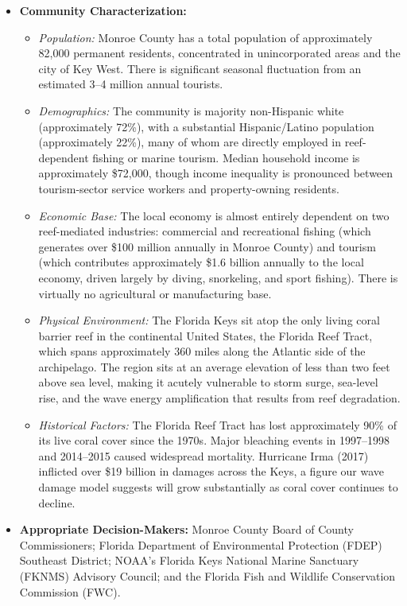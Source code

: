 \documentclass[10pt,letterpaper]{article}
\begin{document}
\begin{itemize}
    \item \textbf{Community Characterization:}
    \begin{itemize}
        \item \textit{Population:} Monroe County has a total population of approximately 82,000 permanent residents, concentrated in unincorporated areas and the city of Key West. There is significant seasonal fluctuation from an estimated 3--4 million annual tourists.
        \item \textit{Demographics:} The community is majority non-Hispanic white (approximately 72\%), with a substantial Hispanic/Latino population (approximately 22\%), many of whom are directly employed in reef-dependent fishing or marine tourism. Median household income is approximately \$72,000, though income inequality is pronounced between tourism-sector service workers and property-owning residents.
        \item \textit{Economic Base:} The local economy is almost entirely dependent on two reef-mediated industries: commercial and recreational fishing (which generates over \$100 million annually in Monroe County) and tourism (which contributes approximately \$1.6 billion annually to the local economy, driven largely by diving, snorkeling, and sport fishing). There is virtually no agricultural or manufacturing base.
        \item \textit{Physical Environment:} The Florida Keys sit atop the only living coral barrier reef in the continental United States, the Florida Reef Tract, which spans approximately 360 miles along the Atlantic side of the archipelago. The region sits at an average elevation of less than two feet above sea level, making it acutely vulnerable to storm surge, sea-level rise, and the wave energy amplification that results from reef degradation.
        \item \textit{Historical Factors:} The Florida Reef Tract has lost approximately 90\% of its live coral cover since the 1970s. Major bleaching events in 1997--1998 and 2014--2015 caused widespread mortality. Hurricane Irma (2017) inflicted over \$19 billion in damages across the Keys, a figure our wave damage model suggests will grow substantially as coral cover continues to decline.
    \end{itemize}

    \item \textbf{Appropriate Decision-Makers:} Monroe County Board of County Commissioners; Florida Department of Environmental Protection (FDEP) Southeast District; NOAA's Florida Keys National Marine Sanctuary (FKNMS) Advisory Council; and the Florida Fish and Wildlife Conservation Commission (FWC).

\end{itemize}
\end{document}
